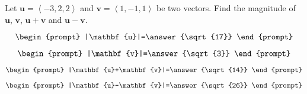 \documentclass{ximera}
\author{Gregory Hartman \and Matthew Carr}
\begin{document}
\begin{exercise}




Let $\mathbf{u}=\left\langle-3,2,2\right\rangle$ and $\mathbf{v}=\left\langle1,-1,1\right\rangle$ be two vectors. Find the magnitude of $\mathbf{u}$, $\mathbf{v}$, $\mathbf{u}+\mathbf{v}$ and $\mathbf{u}-\mathbf{v}$.

\[
\begin{prompt}
|\mathbf{u}|=\answer{\sqrt{17}}
\end{prompt}
\]

\[
\begin{prompt}
|\mathbf{v}|=\answer{\sqrt{3}}
\end{prompt}
\]

\[
\begin{prompt}
|\mathbf{u}+\mathbf{v}|=\answer{\sqrt{14}}
\end{prompt}
\]

\[
\begin{prompt}
|\mathbf{u}-\mathbf{v}|=\answer{\sqrt{26}}
\end{prompt}
\]


\end{exercise}
\end{document}
